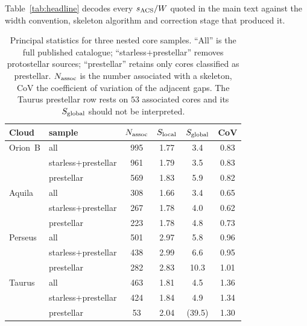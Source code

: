 \documentclass[usenatbib,twoside,twocolumn]{mnras}
\begin{document}
Table~\ref{tab:headline} decodes every $s_{\rm ACS}/W$ quoted in the main text against the width convention, skeleton algorithm and correction stage that produced it.

\begin{table}
\caption{Principal statistics for three nested core samples. ``All'' is the full published catalogue; ``starless$+$prestellar'' removes protostellar sources; ``prestellar'' retains only cores classified as prestellar. $N_{\rm assoc}$ is the number associated with a skeleton, CoV the coefficient of variation of the adjacent gaps. The Taurus prestellar row rests on $53$ associated cores and its $S_{\rm global}$ should not be interpreted.}
\label{tab:popsplit}
\footnotesize
\setlength{\tabcolsep}{4pt}
\begin{tabular}{llcccc}
\toprule
Cloud & sample & $N_{\rm assoc}$ & $S_{\rm local}$ & $S_{\rm global}$ & CoV \\
\midrule
Orion~B & all                  & 995 & 1.77 & 3.4 & 0.83 \\
        & starless$+$prestellar& 961 & 1.79 & 3.5 & 0.83 \\
        & prestellar           & 569 & 1.83 & 5.9 & 0.82 \\
\midrule
Aquila  & all                  & 308 & 1.66 & 3.4 & 0.65 \\
        & starless$+$prestellar& 267 & 1.78 & 4.0 & 0.62 \\
        & prestellar           & 223 & 1.78 & 4.8 & 0.73 \\
\midrule
Perseus & all                  & 501 & 2.97 & 5.8 & 0.96 \\
        & starless$+$prestellar& 438 & 2.99 & 6.6 & 0.95 \\
        & prestellar           & 282 & 2.83 & 10.3 & 1.01 \\
\midrule
Taurus  & all                  & 463 & 1.81 & 4.5 & 1.36 \\
        & starless$+$prestellar& 424 & 1.84 & 4.9 & 1.34 \\
        & prestellar           &  53 & 2.04 & (39.5) & 1.30 \\
\bottomrule
\end{tabular}
\end{table}
\end{document}
